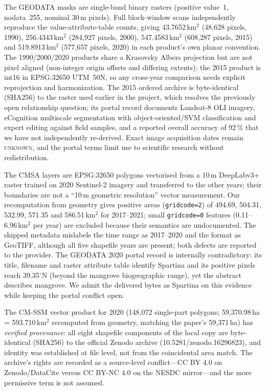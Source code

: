 The GEODATA masks are single-band binary rasters (positive value~1,
nodata~255, nominal 30\,m pixels). Full block-window scans independently
reproduce the value-attribute-table counts, giving 43.7652\,km$^2$
(48{,}628 pixels, 1990), 256.4343\,km$^2$ (284{,}927 pixels, 2000),
547.4583\,km$^2$ (608{,}287 pixels, 2015) and 519.8913\,km$^2$
(577{,}657 pixels, 2020) in each product's own planar convention. The
1990/2000/2020 products share a Krasovsky Albers projection but are not
pixel aligned (non-integer origin offsets and differing extents); the
2015 product is int16 in EPSG:32650 UTM~50N, so any cross-year
comparison needs explicit reprojection and harmonization. The 2015
ordered archive is byte-identical (SHA256) to the raster used earlier in
the project, which resolves the previously open relationship question;
its portal record documents Landsat-8 OLI imagery, eCognition
multiscale segmentation with object-oriented/SVM classification and
expert editing against field samples, and a reported overall accuracy
of 92\,\% that we have not independently re-derived. Exact image
acquisition dates remain \textsc{unknown}, and the portal terms limit
use to scientific research without redistribution.

The CMSA layers are EPSG:32650 polygons vectorised from a 10\,m
DeepLabv3+ raster trained on 2020 Sentinel-2 imagery and transferred to
the other years; their boundaries are not a ``10\,m geometric
resolution'' vector measurement. Our recomputation from geometry gives
positive areas (\texttt{gridcode=2}) of 494.69, 504.31, 532.99, 571.35
and 586.51\,km$^2$ for 2017--2021; small \texttt{gridcode=0} features
(0.11--6.96\,km$^2$ per year) are excluded because their semantics are
undocumented. The shipped metadata mislabels the time range as
2017--2020 and the format as GeoTIFF, although all five shapefile years
are present; both defects are reported to the provider. The GEODATA
2020 portal record is internally contradictory: its title, filename
and raster attribute table identify Spartina and its positive pixels
reach 39.35$^{\circ}$N (beyond the mangrove biogeographic range), yet
the abstract describes mangrove. We admit the delivered bytes as
Spartina on this evidence while keeping the portal conflict open.

The CM-SSM vector product for 2020 (148{,}072 single-part polygons;
59{,}370.98\,ha = 593.710\,km$^2$ recomputed from geometry, matching the
paper's 59{,}371\,ha) has \emph{verified provenance}: all eight
shapefile components of the local copy are byte-identical (SHA256) to
the official Zenodo archive (10.5281/zenodo.16296823), and identity was
established at file level, not from the coincidental area match. The
archive's rights are recorded as a source-level conflict---CC BY 4.0 on
Zenodo/DataCite versus CC BY-NC 4.0 on the NESDC mirror---and the more
permissive term is not assumed.

